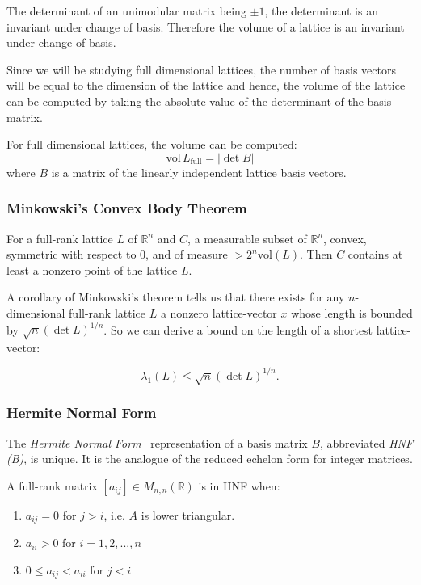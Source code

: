 \documentclass[10pt, a4paper]{article}
\begin{document}
The determinant of an unimodular matrix being $\pm 1$, the determinant is an invariant under change of basis. Therefore the volume of a lattice is an invariant under change of basis.

Since we will be studying full dimensional lattices, the number of basis vectors will be equal to the dimension of the lattice and hence, the volume of the lattice can be computed by taking the absolute value of the determinant of the basis matrix.

For full dimensional lattices, the volume can be computed:
\[
\text{vol} \,L_{\text{full}} = |\det B|
\] where $B$ is a matrix of the linearly independent lattice basis vectors.


\subsubsection{Minkowski's Convex Body Theorem}

For a full-rank lattice $L$ of $\mathbb{R}^n$ and $C$, a measurable subset of $\mathbb{R}^n$, convex, symmetric with respect to 0, and of measure $> 2^n \text{vol}(L)$. Then $C$ contains at least a nonzero point of the lattice $L$.

A corollary of Minkowski's theorem tells us that there exists for any $n$-dimensional full-rank lattice $L$ a nonzero lattice-vector $x$ whose length is bounded by $\sqrt{n} (\det L)^{1/n}$. So we can derive a bound on the length of a shortest lattice-vector:

\[
\lambda_1(L) \leq \sqrt{n} (\det L)^{1/n}.
\]

\subsubsection{Hermite Normal Form}

The \emph{Hermite Normal Form}~\cite{SchnorrStanfordNotes} representation of a basis matrix $B$, abbreviated \emph{HNF (B)}, is unique. It is the analogue of the reduced echelon form for integer matrices.

A full-rank matrix $[a_{ij}] \in M_{n,n} (\mathbb{R})$ is in HNF when:
\begin{enumerate}
\item $a_{ij} = 0$ for $j > i$, i.e. $A$ is lower triangular. 
\item $a_{ii} > 0$ for $i=1,2,...,n$
\item $0 \leq a_{ij} < a_{ii}$ for $j < i$
\end{enumerate}
\end{document}
